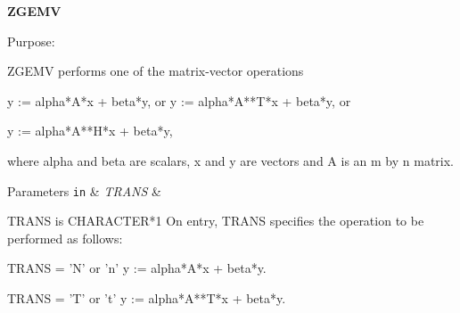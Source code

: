 {\bfseries Z\+G\+E\+M\+V} 

\begin{DoxyParagraph}{Purpose\+: }
\begin{DoxyVerb} ZGEMV  performs one of the matrix-vector operations

    y := alpha*A*x + beta*y,   or   y := alpha*A**T*x + beta*y,   or

    y := alpha*A**H*x + beta*y,

 where alpha and beta are scalars, x and y are vectors and A is an
 m by n matrix.\end{DoxyVerb}
 
\end{DoxyParagraph}

\begin{DoxyParams}[1]{Parameters}
\mbox{\tt in}  & {\em T\+R\+A\+N\+S} & \begin{DoxyVerb}          TRANS is CHARACTER*1
           On entry, TRANS specifies the operation to be performed as
           follows:

              TRANS = 'N' or 'n'   y := alpha*A*x + beta*y.

              TRANS = 'T' or 't'   y := alpha*A**T*x + beta*y.


\end{DoxyVerb}
\end{DoxyParams}
